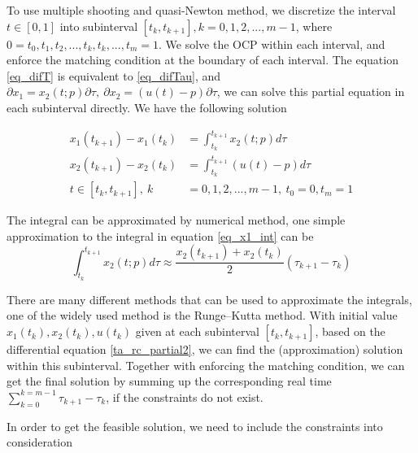 \documentclass  [
  paper    = a4,
  BCOR     = 10mm,
  twoside,
  fontsize = 12pt,
  fleqn,
  toc      = bibnumbered,
  toc      = listofnumbered,
  numbers  = noendperiod,
  headings = normal,
  listof   = leveldown,
  version  = 3.03
]                                       {scrreprt}
\newcommand{\<}{\langle}
\renewcommand{\>}{\rangle}
\begin{document}
   To use multiple shooting and quasi-Newton method, we discretize the interval $t\in [0,1]$ into subinterval $[t_{k}, t_{k+1}], k = 0, 1, 2, ..., m-1$, where $0 = t_0, t_1, t_2, ...,t_k, t_k, ..., t_m = 1$. We solve the OCP within each interval, and enforce the matching condition at the boundary of each interval. 
   The equation \ref{eq_difT} is equivalent to \ref{eq_difTau}, and $\partial x_1= x_2(t;p) \partial \tau, \ \partial x_2 = ( u(t)-p) \partial \tau$, we can solve this partial equation in each subinterval directly. We have the following solution
   
   \begin{subequations}
	\begin{align}
      x_1(t_{k+1}) -  x_1(t_k)  &= \int_{t_k}^{t_{k+1}} x_2(t;p) d \tau \label{eq_x1_int} \\
      x_2(t_{k+1}) -  x_2(t_k)  &= \int_{t_k}^{t_{k+1}} (u(t)-p) d \tau \\
      t \in [t_{k}, t_{k+1}], \  k &= 0, 1, 2, ..., m-1, \  t_0 =0, t_m =1
   	\end{align}
\end{subequations}

The integral can be approximated by numerical method, one simple approximation to the integral in equation \ref{eq_x1_int} can be 
\begin{equation}
\int_{t_k}^{t_{k+1}} x_2(t;p) d \tau  \approx \frac{x_2(t_{k+1}) + x_2(t_k)}{2} (\tau_{k+1} -\tau_k)
\end{equation}

There are many different methods that can be used to approximate the integrals, one of the widely used method is the Runge–Kutta method. With initial value $x_1(t_k),x_2(t_k), u(t_k)$ given at each subinterval $[t_{k}, t_{k+1}]$, based on the differential equation \ref{ta_rc_partial2}, we can find the (approximation) solution within this subinterval. Together with enforcing the matching condition, we can get the final solution by summing up the corresponding real time $\sum_{k=0}^{k=m-1} \tau_{k+1} - \tau_k$, if the constraints do not exist. 


In order to get the feasible solution, we need to include the constraints into consideration 





   
   
   
\end{document}
